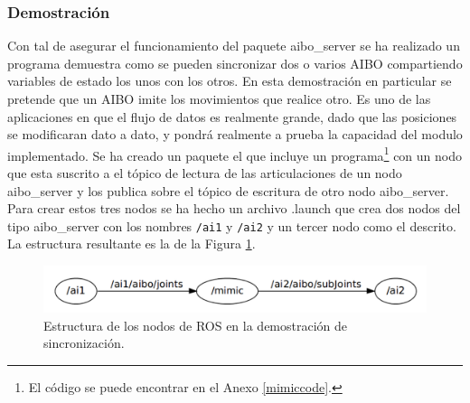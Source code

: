 \documentclass[12pt,a4paper,final,twoside]{book}
\begin{document}
\subsubsection{Demostración}
Con tal de asegurar el funcionamiento del paquete aibo{\_}server se ha realizado un programa demuestra como se pueden sincronizar dos o varios AIBO compartiendo variables de estado los unos con los otros. 
En esta demostración en particular se pretende que un AIBO imite los movimientos que realice otro. Es uno de las aplicaciones en que el flujo de datos es realmente grande, dado que las posiciones se modificaran dato a dato, y pondrá realmente a prueba la capacidad del modulo implementado.
Se ha creado un paquete el que incluye un programa\footnote{El código se puede encontrar en el Anexo \ref{mimiccode}.} con un nodo que esta suscrito a el tópico de lectura de las articulaciones de un nodo aibo{\_}server y los publica sobre el tópico de escritura de otro nodo aibo{\_}server. Para crear estos tres nodos se ha hecho un archivo .launch que crea dos nodos del tipo aibo{\_}server con los nombres \texttt{/ai1} y \texttt{/ai2} y un tercer nodo como el descrito. La estructura resultante es la de la Figura \ref{fig:mimic}.


\begin{figure}[H]
	\centering
    \includegraphics[scale=0.75]{images/mimic.pdf}
	 \caption{Estructura de los nodos de ROS en la demostración de sincronización.}
  \label{fig:mimic}
\end{figure}
\end{document}
